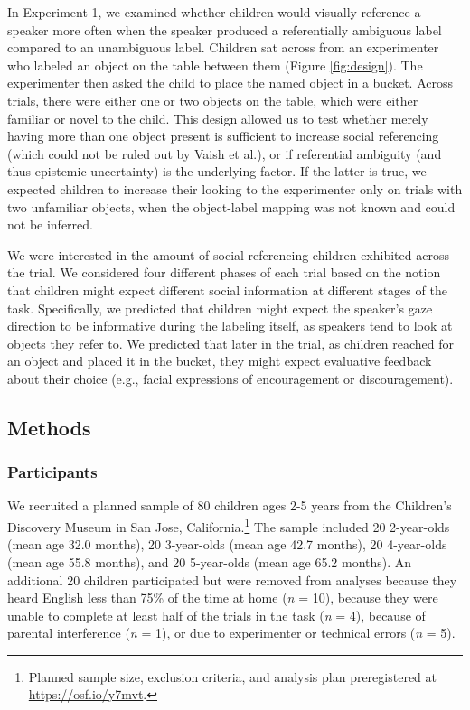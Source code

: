 \documentclass[a4paper,man,apacite,floatsintext]{apa6}
\begin{document}
In Experiment 1, we examined whether children would visually reference a
speaker more often when the speaker produced a referentially ambiguous
label compared to an unambiguous label. Children sat across from an
experimenter who labeled an object on the table between them (Figure
\ref{fig:design}). The experimenter then asked the child to place the
named object in a bucket. Across trials, there were either one or two
objects on the table, which were either familiar or novel to the child.
This design allowed us to test whether merely having more than one
object present is sufficient to increase social referencing (which could
not be ruled out by Vaish et al.), or if referential ambiguity (and thus
epistemic uncertainty) is the underlying factor. If the latter is true,
we expected children to increase their looking to the experimenter only
on trials with two unfamiliar objects, when the object-label mapping was
not known and could not be inferred.

We were interested in the amount of social referencing children
exhibited across the trial. We considered four different phases of each
trial based on the notion that children might expect different social
information at different stages of the task. Specifically, we predicted
that children might expect the speaker's gaze direction to be
informative during the labeling itself, as speakers tend to look at
objects they refer to. We predicted that later in the trial, as children
reached for an object and placed it in the bucket, they might expect
evaluative feedback about their choice (e.g., facial expressions of
encouragement or discouragement).

\subsection{Methods}\label{methods}

\subsubsection{Participants}\label{participants}

We recruited a planned sample of 80 children ages 2-5 years from the
Children's Discovery Museum in San Jose, California.\footnote{Planned
  sample size, exclusion criteria, and analysis plan preregistered at
  \url{https://osf.io/y7mvt}.} The sample included 20 2-year-olds (mean
age 32.0 months), 20 3-year-olds (mean age 42.7 months), 20 4-year-olds
(mean age 55.8 months), and 20 5-year-olds (mean age 65.2 months). An
additional 20 children participated but were removed from analyses
because they heard English less than 75\% of the time at home (\emph{n}
= 10), because they were unable to complete at least half of the trials
in the task (\emph{n} = 4), because of parental interference (\emph{n} =
1), or due to experimenter or technical errors (\emph{n} = 5).
\end{document}
